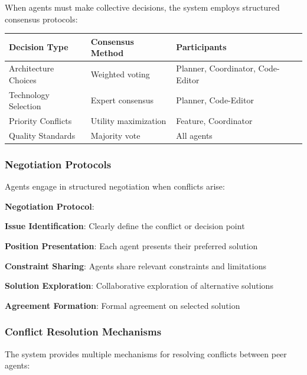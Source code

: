When agents must make collective decisions, the system employs structured consensus protocols:

\begin{center}
\begin{tabular}{@{}lll@{}}
\toprule
\textbf{Decision Type} & \textbf{Consensus Method} & \textbf{Participants} \\
\midrule
Architecture Choices & Weighted voting & Planner, Coordinator, Code-Editor \\
Technology Selection & Expert consensus & Planner, Code-Editor \\
Priority Conflicts & Utility maximization & Feature, Coordinator \\
Quality Standards & Majority vote & All agents \\
\bottomrule
\end{tabular}
\end{center}

\subsubsection*{Negotiation Protocols}

Agents engage in structured negotiation when conflicts arise:

\begin{alertbox}
\textbf{Negotiation Protocol}:
\begin{compactlist}
    \item \textbf{Issue Identification}: Clearly define the conflict or decision point
    \item \textbf{Position Presentation}: Each agent presents their preferred solution
    \item \textbf{Constraint Sharing}: Agents share relevant constraints and limitations
    \item \textbf{Solution Exploration}: Collaborative exploration of alternative solutions
    \item \textbf{Agreement Formation}: Formal agreement on selected solution
\end{compactlist}
\end{alertbox}

\subsubsection*{Conflict Resolution Mechanisms}

The system provides multiple mechanisms for resolving conflicts between peer agents:

